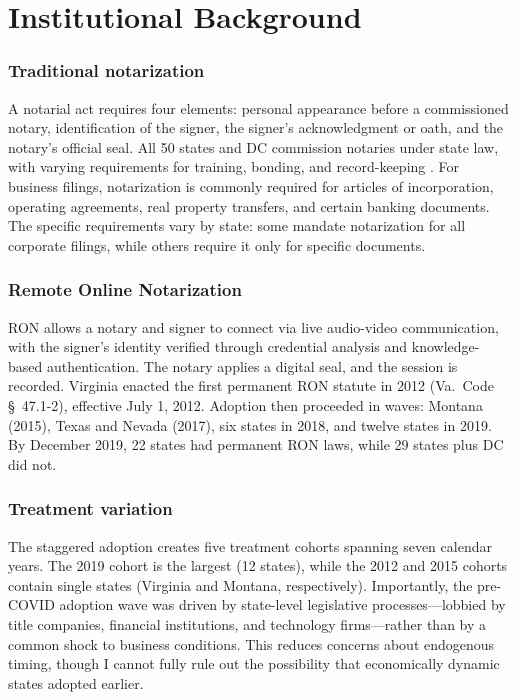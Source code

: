 \documentclass[12pt]{article}
\begin{document}
\section{Institutional Background}

\subsubsection*{Traditional notarization} A notarial act requires four elements: personal appearance before a commissioned notary, identification of the signer, the signer's acknowledgment or oath, and the notary's official seal. All 50 states and DC commission notaries under state law, with varying requirements for training, bonding, and record-keeping \citep{national_notary_association2020}. For business filings, notarization is commonly required for articles of incorporation, operating agreements, real property transfers, and certain banking documents. The specific requirements vary by state: some mandate notarization for all corporate filings, while others require it only for specific documents.

\subsubsection*{Remote Online Notarization} RON allows a notary and signer to connect via live audio-video communication, with the signer's identity verified through credential analysis and knowledge-based authentication. The notary applies a digital seal, and the session is recorded. Virginia enacted the first permanent RON statute in 2012 (Va.\ Code \S\ 47.1-2), effective July 1, 2012. Adoption then proceeded in waves: Montana (2015), Texas and Nevada (2017), six states in 2018, and twelve states in 2019. By December 2019, 22 states had permanent RON laws, while 29 states plus DC did not.

\subsubsection*{Treatment variation} The staggered adoption creates five treatment cohorts spanning seven calendar years. The 2019 cohort is the largest (12 states), while the 2012 and 2015 cohorts contain single states (Virginia and Montana, respectively). Importantly, the pre-COVID adoption wave was driven by state-level legislative processes---lobbied by title companies, financial institutions, and technology firms---rather than by a common shock to business conditions. This reduces concerns about endogenous timing, though I cannot fully rule out the possibility that economically dynamic states adopted earlier.
\end{document}

